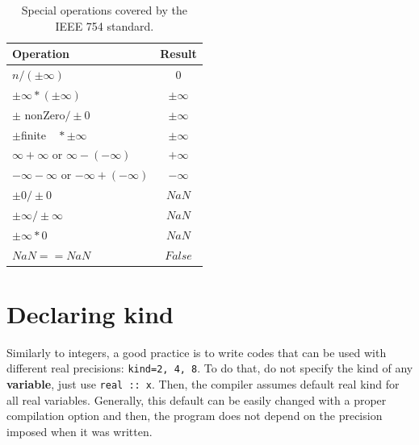 \begin{table}
    \centering
    \begin{tabular}{| l | c |}
        \hline
        Operation & Result \\ \hline
        $ n / \left(\pm \infty\right) $            &     $	0$              \\ \hline
        $\pm \infty * \left( \pm \infty\right) $    &     $	\pm \infty$      \\ \hline
        $\pm$ nonZero$ / \pm 0 $            &    $	\pm \infty$       \\ \hline
        $\pm $finite$\quad * \pm \infty $      &    $	\pm \infty$       \\ \hline
        $\infty+\infty$  or  $\infty- \left(-\infty\right) $	     &       $+\infty$\\ \hline    
        $-\infty - \infty$   or  $-\infty + \left( -\infty \right) $   &        $	-\infty$\\ \hline
        $\pm 0 / \pm 0 $                  &        $	NaN$         \\ \hline
        $\pm \infty / \pm \infty $    &        $	NaN$     \\ \hline
        $\pm \infty * 0 $            &        $	NaN$     \\ \hline
        $ NaN == NaN $               &    $	False $      \\ \hline
    \end{tabular}
    \caption{Special operations covered by the IEEE 754 standard.}
    \label{tab:SpecialOperations}
\end{table}





    \section{Declaring kind} 


Similarly to integers, a good practice is to write codes that can be used with different real precisions:
\texttt{kind=2, 4, 8}. To do that, do not specify the kind of any \textbf{variable}, just use \texttt{real :: x}. 
Then, the compiler assumes default real kind for all real variables. 
Generally, this default can be easily changed with a proper compilation option and then, 
the program does not depend on the precision imposed when it was written. 

